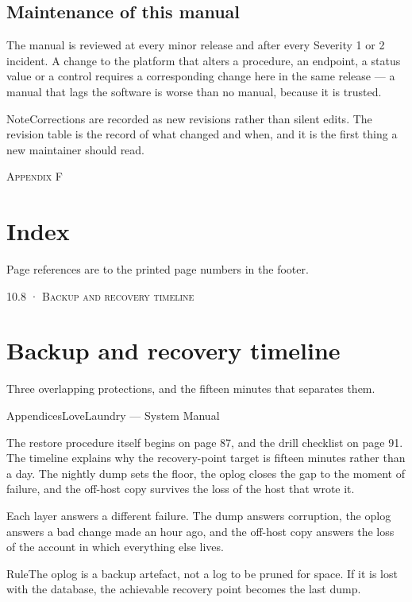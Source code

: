 \documentclass[11pt,a4paper,oneside]{book}
\begin{document}
\subsection*{Maintenance of this manual}
The manual is reviewed at every minor release and after every Severity 1 or 2 incident. A change to the platform that alters a procedure, an endpoint, a status value or a control requires a corresponding change here in the same release — a manual that lags the software is worse than no manual, because it is trusted.

\begin{notebox}NoteCorrections are recorded as new revisions rather than silent edits. The revision table is the record of what changed and when, and it is the first thing a new maintainer should read.\end{notebox}
\textsc{\small\color{crimson}Appendix F}\par\medskip
\section*{Index}
Page references are to the printed page numbers in the footer.

\textsc{\small\color{crimson}10.8 · Backup and recovery timeline}\par\medskip
\section*{Backup and recovery timeline}
Three overlapping protections, and the fifteen minutes that separates them.

AppendicesLoveLaundry — System Manual

The restore procedure itself begins on page 87, and the drill checklist on page 91. The timeline explains why the recovery-point target is fifteen minutes rather than a day. The nightly dump sets the floor, the oplog closes the gap to the moment of failure, and the off-host copy survives the loss of the host that wrote it.

Each layer answers a different failure. The dump answers corruption, the oplog answers a bad change made an hour ago, and the off-host copy answers the loss of the account in which everything else lives.

\begin{notebox}RuleThe oplog is a backup artefact, not a log to be pruned for space. If it is lost with the database, the achievable recovery point becomes the last dump.\end{notebox}
\end{document}

